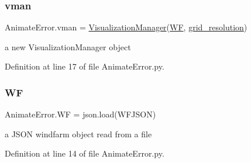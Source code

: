 \mbox{\label{namespace_animate_error_a7c61e5c3dcf8f34394aafe41966b8bf5}} 
\subsubsection{\texorpdfstring{vman}{vman}}
{\footnotesize\ttfamily Animate\+Error.\+vman = \mbox{\hyperlink{classvisualization__manager___d_j_1_1_visualization_manager}{Visualization\+Manager}}(\mbox{\hyperlink{namespace_animate_error_a25b033c46671da0b48bee3587cf370c1}{WF}}, \mbox{\hyperlink{namespace_animate_error_a80b6ca5f039907594eec504621ef9574}{grid\+\_\+resolution}})}



a new Visualization\+Manager object 



Definition at line 17 of file Animate\+Error.\+py.

\mbox{\label{namespace_animate_error_a25b033c46671da0b48bee3587cf370c1}} 
\subsubsection{\texorpdfstring{WF}{WF}}
{\footnotesize\ttfamily Animate\+Error.\+WF = json.\+load(W\+F\+J\+S\+ON)}



a J\+S\+ON windfarm object read from a file 



Definition at line 14 of file Animate\+Error.\+py.

